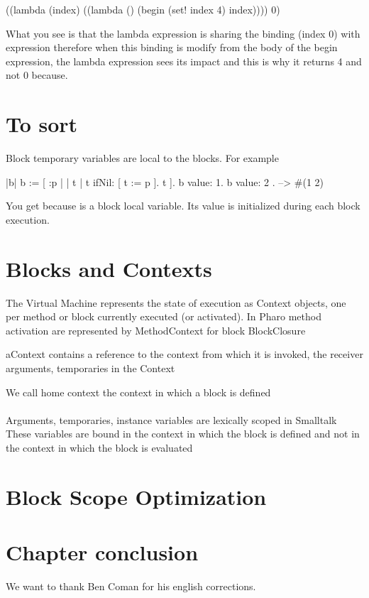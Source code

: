 \documentclass[a4paper,10pt,twoside]{book}
\begin{document}
\begin{code}{}
((lambda (index)
   ((lambda () (begin 
                (set! index 4)
                index))))
 0)
\end{code}


What you see is that the lambda expression is sharing the binding (index 0) with expression 
therefore when this binding is modify from the body of the begin expression, the lambda expression sees its impact
and this is why it returns 4 and not 0 because. 


\section{To sort}
Block temporary variables are local to the blocks. For example


\begin{code}{}
|b|
b := [ :p |
	| t |
	t ifNil: [ t := p ].
	t ].
{ b value: 1. b value: 2 }.
   -->  #(1 2)
\end{code}

You get  because  is a block local variable. Its value is initialized during each block execution.




\section{Blocks and Contexts}


The Virtual Machine represents the state of execution as Context objects, one per method or block currently executed (or activated). In Pharo method activation are represented by MethodContext
for block BlockClosure

aContext contains a reference to the context from which it is invoked, the receiver arguments, temporaries in the Context

We call home context the context in which a block is defined


\paragraph{}
Arguments, temporaries, instance variables are lexically scoped in Smalltalk
These variables are bound in the context in which the block is defined and not in the context in which the block is evaluated




\section{Block Scope Optimization}


\section{Chapter conclusion}


We want to thank Ben Coman for his english corrections.
\ifx\wholebook\relax\else
   
   
\end{document}
